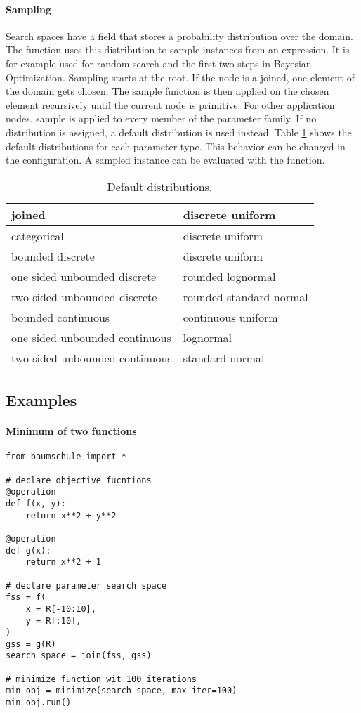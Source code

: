 \documentclass[english]{article}
\begin{document}
\paragraph{Sampling} Search spaces have a  field that stores a probability distribution over the domain. The  function uses this distribution to sample instances from an expression. It is for example used for random search and the first two steps in Bayesian Optimization. Sampling starts at the root. If the node is a joined, one element of the domain gets chosen. The sample function is then applied on the chosen element recursively until the current node is primitive. For other application nodes, sample is applied to every member of the parameter family. If no distribution is assigned, a default distribution is used instead. Table \ref{default dists} shows the default distributions for each parameter type. This behavior can be changed in the configuration. A sampled instance can be evaluated with the  function.

\begin{table}
\centering
\begin{tabular}{|l|l|}
\hline joined & discrete uniform \\
\hline categorical & discrete uniform \\
\hline bounded discrete & discrete uniform \\
\hline one sided unbounded discrete & rounded lognormal \\
\hline two sided unbounded discrete & rounded standard normal \\
\hline bounded continuous & continuous uniform \\
\hline one sided unbounded continuous & lognormal \\
\hline two sided unbounded continuous & standard normal \\
\hline
\end{tabular}
\caption{Default distributions.}
\label{default dists}
\end{table}


\subsection{Examples}

\paragraph{Minimum of two functions}
\begin{verbatim}
from baumschule import *

# declare objective fucntions
@operation
def f(x, y):
    return x**2 + y**2

@operation
def g(x):
    return x**2 + 1

# declare parameter search space
fss = f(
    x = R[-10:10],
    y = R[:10],
)
gss = g(R)
search_space = join(fss, gss)

# minimize function wit 100 iterations
min_obj = minimize(search_space, max_iter=100)
min_obj.run()

\end{verbatim}
\end{document}
